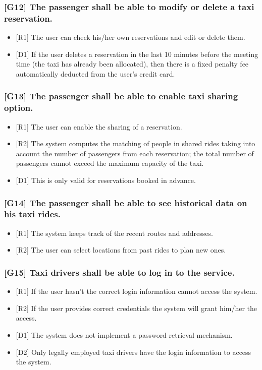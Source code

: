 \documentclass[a4paper,11pt]{report} %
\begin{document}
	\subsubsection{{[}G12{]} The passenger shall be able to modify or delete a taxi reservation.}
	\begin{itemize}
		\item {[}R1{]} The user can check his/her own reservations and edit or delete them.
		\item {[}D1{]} If the user deletes a reservation in the last 10 minutes before the meeting time (the taxi has already been allocated), then there is a fixed penalty fee automatically deducted from the user's credit card.
	\end{itemize}
	
	\subsubsection{{[}G13{]} The passenger shall be able to enable taxi sharing option.}
	\begin{itemize}
		\item {[}R1{]} The user can enable the sharing of a reservation.
		\item {[}R2{]} The system computes the matching of people in shared rides taking into account the number of passengers from each reservation; the total number of passengers cannot exceed the maximum capacity of the taxi.
		\item {[}D1{]} This is only valid for reservations booked in advance.
	\end{itemize}
		
	\subsubsection{{[}G14{]} The passenger shall be able to see historical data on his taxi rides.}
	\begin{itemize}
		\item {[}R1{]} The system keeps track of the recent routes and addresses.
		\item {[}R2{]} The user can select locations from past rides to plan new ones.
	\end{itemize}

	\subsubsection{{[}G15{]} Taxi drivers shall be able to log in to the service.}
	\begin{itemize}
		\item {[}R1{]} If the user hasn't the correct login information cannot access the system.
		\item {[}R2{]} If the user provides correct credentials the system will grant him/her the access.
		\item {[}D1{]} The system does not implement a password retrieval mechanism.
		\item {[}D2{]} Only legally employed taxi drivers have the login information to access the system.
	\end{itemize}
	
\end{document}
